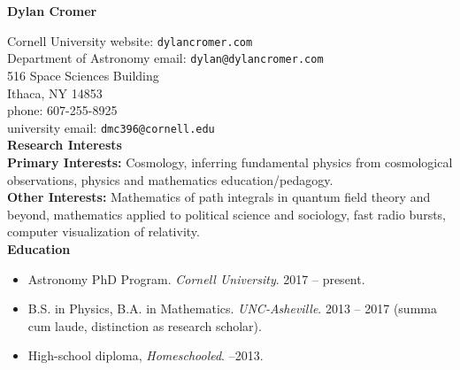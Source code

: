 \documentclass[a4paper, 11pt]{article}
\title{}
\author{}
\date{Last Edited: \today}
\newcommand{\myrule}{\hrulefill}
\newcommand{\noi}{\noindent}
\begin{document}
\begin{center} 
\textbf{Dylan Cromer} 
\\
\myrule
\end{center}

\noi Cornell University \hfill website: \texttt{dylancromer.com}
\\
Department of Astronomy \hfill email: \texttt{dylan@dylancromer.com}
\\
516 Space Sciences Building \hfill
\\
Ithaca, NY 14853 \hfill
\\
phone: 607-255-8925 \hfill
\\
university email: \texttt{dmc396@cornell.edu} \hfill
\\

\noi \textbf{Research Interests}
\\

\noi \textbf{Primary Interests:} Cosmology, inferring fundamental physics from cosmological observations, physics and mathematics education/pedagogy.
\\

\noi \textbf{Other Interests:} Mathematics of path integrals in quantum field theory and beyond, mathematics applied to political science and sociology, fast radio bursts, computer visualization of relativity.
\\

\noi \textbf{Education}
\begin{itemize}[leftmargin=*]
\item Astronomy PhD Program. \emph{Cornell University}. 2017 -- present.
	\item \noi B.S. in Physics, B.A. in Mathematics. \emph{UNC-Asheville}. 2013 -- 2017 (summa cum laude, distinction as research scholar). 
	\item \noi High-school diploma, \emph{Homeschooled}. --2013.
	\\
\end{itemize}
\end{document}
